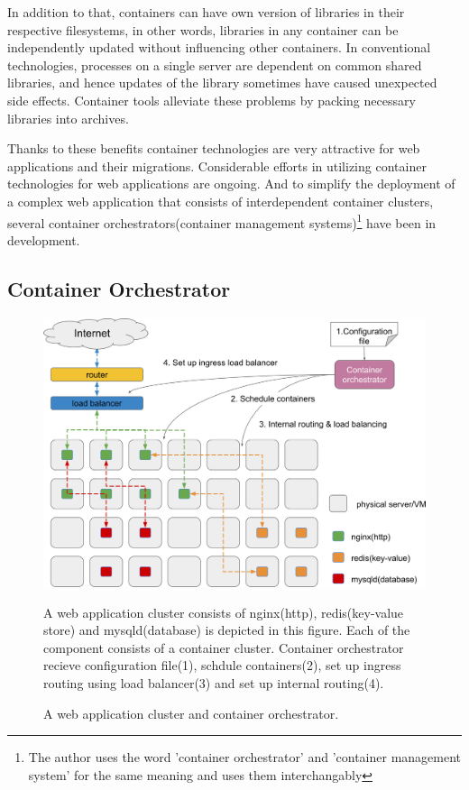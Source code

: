In addition to that, containers can have own version of libraries in their respective filesystems, in other words, libraries in any container can be independently updated without influencing other containers.
In conventional technologies, processes on a single server are dependent on common shared libraries, and hence updates of the library sometimes have caused unexpected side effects.
Container tools alleviate these problems by packing necessary libraries into archives. 

Thanks to these benefits container technologies are very attractive for web applications and their migrations.
Considerable efforts in utilizing container technologies for web applications are ongoing.
And to simplify the deployment of a complex web application that consists of interdependent container clusters, several container orchestrators(container management systems)\footnote{The author uses the word 'container orchestrator' and 'container management system' for the same meaning and uses them interchangably} have been in development.

\subsection{Container Orchestrator}

\begin{figure}[h]
\begin{center}
\includegraphics[width=0.9\columnwidth]{Figs/container_management_system}
\end{center}
\caption{
A web application cluster and container orchestrator.
}
\centering\parbox[c]{0.9\columnwidth}{
A web application cluster consists of nginx(http), redis(key-value store) and mysqld(database) is depicted in this figure. 
Each of the component consists of a container cluster.
Container orchestrator recieve configuration file(1), schdule containers(2), set up ingress routing using load balancer(3) and set up internal routing(4).
}
\label{fig:container_management_system}
\end{figure}

